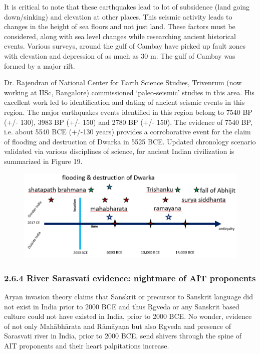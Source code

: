 It is critical to note that these earthquakes lead to lot of subsidence (land going down/sinking) and elevation at other places. This seismic activity leads to changes in the height of sea floors and not just land. These factors must be considered, along with sea level changes while researching ancient historical events. Various surveys, around the gulf of Cambay have picked up fault zones with elevation and depression of as much as 30 m. The gulf of Cambay was formed by a major rift.

Dr. Rajendran of National Center for Earth Science Studies, Trivenrum (now working at IISc, Bangalore) commissioned ‘paleo-seismic’ studies in this area. His excellent work led to identification and dating of ancient seismic events in this region. The major earthquakes events identified in this region belong to 7540 BP (+/- 130), 3983 BP (+/- 150) and 2780 BP (+/- 150). The evidence of 7540 BP, i.e. about 5540 BCE (+/-130 years) provides a corroborative event for the claim of flooding and destruction of Dwarka in 5525 BCE. Updated chronology scenario validated via various disciplines of science, for ancient Indian civilization is summarized in Figure 19.

\begin{figure}[!htbp]
\includegraphics[scale=0.31]{"images/8-19.jpg"}
\caption{}\label{art8-fig19}
\end{figure}


\subsubsection*{2.6.4 River Sarasvati evidence: nightmare of AIT proponents}

Aryan invasion theory claims that Sanskrit or precursor to Sanskrit language did not exist in India prior to 2000 BCE and thus Ṛgveda or any Sanskrit based culture could not have existed in India, prior to 2000 BCE. No wonder, evidence of not only Mahābhārata and Rāmāyaņa but also Ṛgveda and presence of Sarasvati river in India, prior to 2000 BCE, send shivers through the spine of AIT proponents and their heart palpitations increase.

